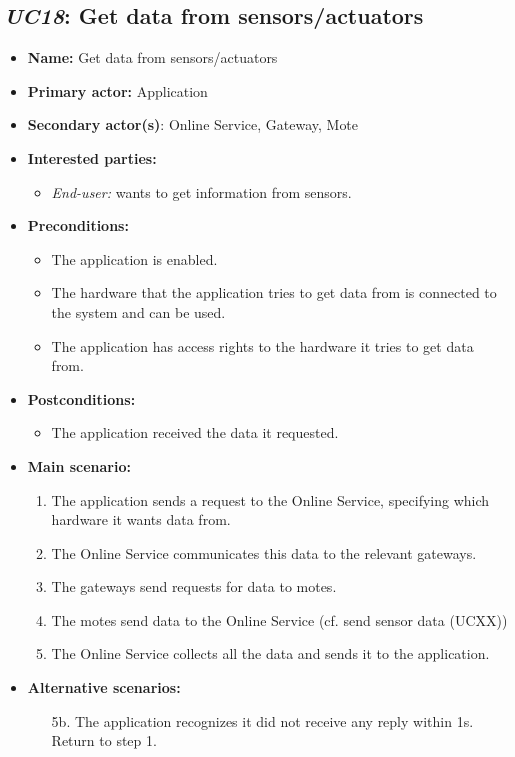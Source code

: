 \subsection{\emph{UC18}: Get data from sensors/actuators}
\begin{itemize}
    \item \textbf{Name:} Get data from sensors/actuators
    \item \textbf{Primary actor:} Application
    \item \textbf{Secondary actor(s)}: Online Service, Gateway, Mote
    \item \textbf{Interested parties:}
        \begin{itemize}
            \item \textit{End-user:} wants to get information from sensors.
        \end{itemize}

    \item \textbf{Preconditions:}
        \begin{itemize}
            \item The application is enabled.
            \item The hardware that the application tries to get data from
                  is connected to the system and can be used.
            \item The application has access rights to the hardware it tries to
                  get data from.
        \end{itemize}

    \item \textbf{Postconditions:}
        \begin{itemize}
            \item The application received the data it requested.
        \end{itemize}

    \item \textbf{Main scenario:}
    \begin{enumerate}
       \item The application sends a request to the Online Service, specifying
             which hardware it wants data from.
       \item The Online Service communicates this data to the relevant gateways.
       \item The gateways send requests for data to motes.
       \item The motes send data to the Online Service (cf. send sensor data (UCXX))
       \item The Online Service collects all the data and sends it to the application.
    \end{enumerate}

    \item \textbf{Alternative scenarios:}
    \begin{enumerate}
        \item [5b.] The application recognizes it did not receive any reply within 1s.
                    Return to step 1.
    \end{enumerate}
\end{itemize}
